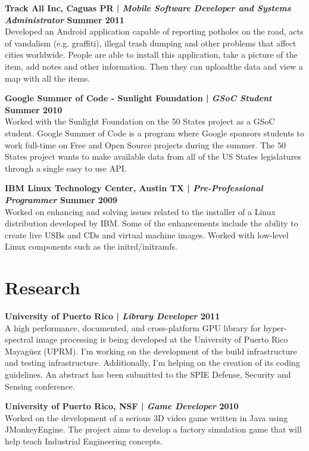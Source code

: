 \documentclass[margin,line]{res}
\begin{document}
\begin{resume}
{\bf Track All Inc, Caguas PR | {\em Mobile Software Developer and Systems Administrator} \hfill {\bf Summer 2011 \\} }
\vspace{-.01cm}
Developed an Android application capable of reporting potholes on the road, acts of vandalism (e.g. graffiti), illegal trash dumping and other problems that affect cities worldwide. People are able to install this application, take a picture of the item, add notes and other information. Then they can uploadthe data and view a map with all the items.

{\bf Google Summer of Code - Sunlight Foundation | {\em GSoC Student} \hfill {\bf Summer 2010 \\} }
\vspace{-.01cm}
Worked with the Sunlight Foundation on the 50 States project as a GSoC student. Google Summer of Code is a program where Google sponsors students to work full-time on Free and Open Source projects during the summer. The 50 States project wants to make available data from all of the US States legislatures through a single easy to use API.

{\bf IBM Linux Technology Center, Austin TX | {\em Pre-Professional Programmer} \hfill {\bf Summer 2009 \\} }
\vspace{-.01cm}
Worked on enhancing and solving issues related to the installer of a Linux distribution developed
by IBM. Some of the enhancements include the ability to create live USBs and CDs and virtual
machine images. Worked with low-level Linux components such as the initrd/initramfs.

\section{\sc Research}

{\bf University of Puerto Rico | {\em Library Developer} \hfill {\bf 2011 \\} }
\vspace{-.01cm}
A high performance, documented, and cross-platform GPU library for hyper-spectral image processing is being developed at the University of Puerto Rico Mayagüez (UPRM). I'm working on the development of the build infrastructure and testing infrastructure. Additionally, I'm helping on the creation of its coding guidelines. An abstract has been submitted to the SPIE Defense, Security and Sensing conference. 

{\bf University of Puerto Rico, NSF | {\em Game Developer} \hfill {\bf 2010 \\} }
\vspace{-.01cm}
Worked on the development of a serious 3D video game written in Java using JMonkeyEngine. The project aims to develop a factory simulation game that will help teach Industrial Engineering concepts.


\end{resume}
\end{document}
